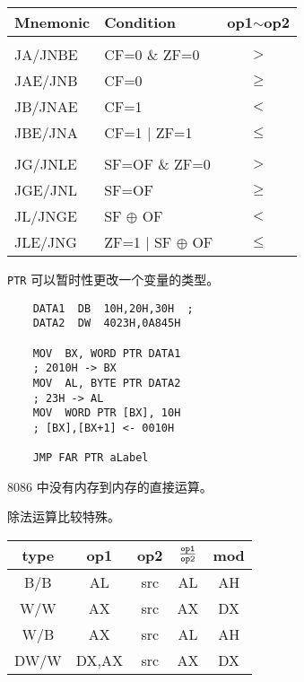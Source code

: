 \begin{table*}
\begin{minipage}{0.4\textwidth}
		\begin{tabular}{|>{\ttfamily}l|>{\ttfamily}l|c|}
			\hline
			Mnemonic & Condition & op1$\sim$op2 \\
			\hline
			\multicolumn{3}{|c|}{Signed} \\
			\hline
			JA/JNBE & CF=0 \& ZF=0 & $>$ \\
			JAE/JNB & CF=0 & $\geq$ \\
			JB/JNAE & CF=1 & $<$\\
			JBE/JNA & CF=1 | ZF=1 & $\leq$ \\
			\hline
			\multicolumn{3}{|c|}{Unsigned} \\
			\hline
			JG/JNLE & SF=OF \& ZF=0 & $>$ \\
			JGE/JNL & SF=OF &$\geq$ \\
			JL/JNGE & SF $\oplus$ OF & $<$\\
			JLE/JNG & ZF=1 | SF $\oplus$ OF & $\leq$ \\
			\hline
		\end{tabular}
	\end{minipage}
\end{table*}

\texttt{PTR} 可以暂时性更改一个变量的类型。
\begin{verbatim}
	DATA1  DB  10H,20H,30H  ;  
	DATA2  DW  4023H,0A845H 

	MOV  BX, WORD PTR DATA1	
	; 2010H -> BX
	MOV  AL, BYTE PTR DATA2	
	; 23H -> AL 
	MOV  WORD PTR [BX], 10H 
	; [BX],[BX+1] <- 0010H
	
	JMP FAR PTR aLabel
\end{verbatim}

8086 中没有内存到内存的直接运算。

除法运算比较特殊。

\begin{table}[H]
\begin{tabular}{|c|>{\ttfamily}c|>{\ttfamily}c|>{\ttfamily}c|>{\ttfamily}c|}
	\hline
	type & op1 & op2 & $\frac{\tt op1}{\tt op2}$ & mod \\
	\hline
	B/B & AL & src & AL & AH \\
	\hline
	W/W & AX & src & AX & DX \\
	\hline
	W/B & AX & src & AL & AH \\
	\hline
	DW/W & DX,AX & src & AX & DX \\
	\hline
\end{tabular}
\end{table}

